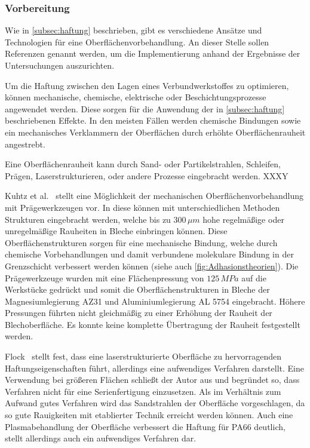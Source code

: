 \subsubsection{Vorbereitung}

Wie in \autoref{subsec:haftung} beschrieben, gibt es verschiedene Ansätze und Technologien für eine Oberflächenvorbehandlung.
An dieser Stelle sollen Referenzen genannt werden, um die Implementierung anhand der Ergebnisse der Untersuchungen auszurichten.

Um die Haftung zwischen den Lagen eines Verbundwerkstoffes zu optimieren, können mechanische, chemische, elektrische oder Beschichtungsprozesse angewendet werden.
Diese sorgen für die Anwendung der in \autoref{subsec:haftung} beschriebenen Effekte.
In den meisten Fällen werden chemische Bindungen sowie ein mechanisches Verklammern der Oberflächen durch erhöhte Oberflächenrauheit angestrebt.

Eine Oberflächenrauheit kann durch Sand- oder Partikelstrahlen, Schleifen, Prägen, Laserstrukturieren, oder andere Prozesse eingebracht werden.
XXXY

Kuhtz et al.~\cite{Kuhtz2019} stellt eine Möglichkeit der mechanischen Oberflächenvorbehandlung mit Prägewerkzeugen vor.
In diese können mit unterschiedlichen Methoden Strukturen eingebracht werden, welche bis zu $300\, \mu m$ hohe regelmäßige oder unregelmäßige Rauheiten in Bleche einbringen können.
Diese Oberflächenstrukturen sorgen für eine mechanische Bindung, welche durch chemische Vorbehandlungen und damit verbundene molekulare Bindung in der Grenzschicht verbessert werden können (siehe auch \autoref{fig:Adhasionstheorien}).
Die Prägewerkzeuge wurden mit eine Flächenpressung von $125\, MPa$ auf die Werkstücke gedrückt und somit die Oberflächenstrukturen in Bleche der Magnesiumlegierung AZ31 und Aluminiumlegierung AL 5754 eingebracht.
Höhere Pressungen führten nicht gleichmäßig zu einer Erhöhung der Rauheit der Blechoberfläche.
Es konnte keine komplette Übertragung der Rauheit festgestellt werden.

Flock~\cite{Flock2012} stellt fest, dass eine laserstrukturierte Oberfläche zu hervorragenden Haftungseigenschaften führt, allerdings eine aufwendiges Verfahren darstellt.
Eine Verwendung bei größeren Flächen schließt der Autor aus und begründet so, dass Verfahren nicht für eine Serienfertigung einzusetzen.
Als im Verhältnis zum Aufwand gutes Verfahren wird das Sandstrahlen der Oberfläche vorgeschlagen, da so gute Rauigkeiten mit etablierter Technik erreicht werden können.
Auch eine Plasmabehandlung der Oberfläche verbessert die Haftung für PA66 deutlich, stellt allerdings auch ein aufwendiges Verfahren dar.

